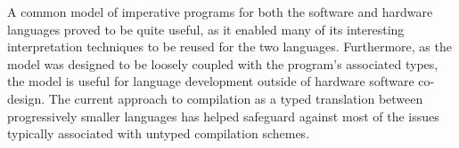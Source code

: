 \documentclass[../paper.tex]{subfiles}
\begin{document}
A common model of imperative programs for both the software and hardware languages proved to be quite useful, as it enabled many of its interesting interpretation techniques to be reused for the two languages. Furthermore, as the model was designed to be loosely coupled with the program's associated types, the model is useful for language development outside of hardware software co-design. The current approach to compilation as a typed translation between progressively smaller languages has helped safeguard against most of the issues typically associated with untyped compilation schemes.
\end{document}
